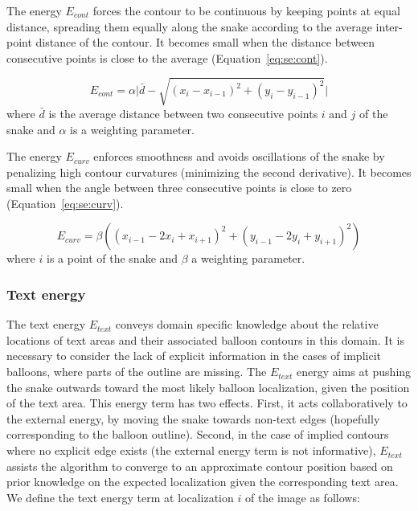 The energy $E_{cont}$ forces the contour to be continuous by keeping points at equal distance, spreading them equally along the snake according to the average inter-point distance of the contour.
It becomes small when the distance between consecutive points is close to the average (Equation~\ref{eq:se:cont}).

\begin{equation}\label{eq:se:cont}
 E_{cont} = \alpha \Big|\bar{d} - \sqrt{(x_i - x_{i-1} )^2 + (y_i - y_{i-1} )^2}\Big|
\end{equation}
where $\bar{d}$ is the average distance between two consecutive points $i$ and $j$ of the snake and $\alpha$ is a weighting parameter.

The energy $E_{curv}$ enforces smoothness and avoids oscillations of the snake by penalizing high contour curvatures (minimizing the second derivative).
It becomes small when the angle between three consecutive points is close to zero (Equation~\ref{eq:se:curv}).

\begin{equation}\label{eq:se:curv}
  E_{curv} = \beta \left( (x_{i-1} - 2x_{i} + x_{i+1})^2 + (y_{i-1} - 2y_{i} + y_{i+1})^2 \right)
\end{equation}
where $i$ is a point of the snake and $\beta$ a weighting parameter.


\subsubsection{Text energy}
\label{sec:se:text_energie}

The text energy $E_{text}$ conveys domain specific knowledge about the relative locations of text areas and their associated balloon contours in this domain.
It is necessary to consider the lack of explicit information in the cases of implicit balloons, where parts of the outline are missing.
The $E_{text}$ energy aims at pushing the snake outwards toward the most likely balloon localization, given the position of the text area.
This energy term has two effects.
First, it acts collaboratively to the external energy, by moving the snake towards non-text edges (hopefully corresponding to the balloon outline).
Second, in the case of implied contours where no explicit edge exists (the external energy term is not informative), $E_{text}$ assists the algorithm to converge to an approximate contour position based on prior knowledge on the expected localization given the corresponding text area.
We define the text energy term at localization $i$ of the image as follows:

